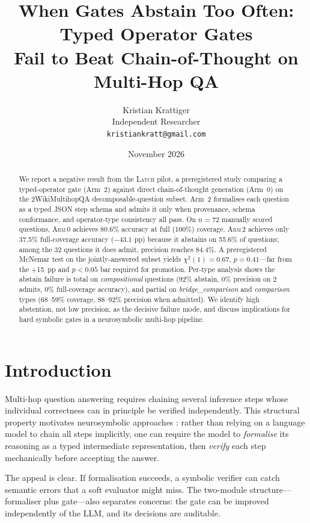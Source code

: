 \documentclass[11pt]{article}
\title{When Gates Abstain Too Often: Typed Operator Gates\\
       Fail to Beat Chain-of-Thought on Multi-Hop QA}
\author{Kristian Krattiger\\
        Independent Researcher\\
        \texttt{kristiankratt@gmail.com}}
\date{November 2026}
\newcommand{\armi}{\textsc{Arm\,0}}
\newcommand{\armii}{\textsc{Arm\,2}}
\newcommand{\latch}{\textsc{Latch}}
\newcommand{\mcnem}{McNemar}
\newcommand{\pval}[1]{$p\!=\!#1$}
\newcommand{\chisq}[1]{$\chi^2(1)\!=\!#1$}
\begin{document}
\maketitle

\begin{abstract}
We report a negative result from the \latch{} pilot, a preregistered study
comparing a typed-operator gate (Arm~2) against direct chain-of-thought
generation (Arm~0) on the 2WikiMultihopQA decomposable-question subset.
Arm~2 formalises each question as a typed JSON step schema and admits
it only when provenance, schema conformance, and operator-type consistency
all pass.  On $n{=}72$ manually scored questions, \armi{} achieves
80.6\% accuracy at full (100\%) coverage.  \armii{} achieves only 37.5\%
full-coverage accuracy ($-43.1$ pp) because it abstains on 55.6\% of
questions; among the 32 questions it does admit, precision reaches 84.4\%.
A preregistered \mcnem{} test on the jointly-answered subset
yields \chisq{0.67}, \pval{0.41}—far from the \mbox{+15 pp} and $p<0.05$
bar required for promotion.  Per-type analysis shows the abstain
failure is total on \emph{compositional} questions (92\% abstain, 0\%
precision on 2 admits, 0\% full-coverage accuracy), and partial on
\emph{bridge\_comparison} and \emph{comparison} types (68–59\% coverage,
88–92\% precision when admitted).  We identify high abstention, not low
precision, as the decisive failure mode, and discuss implications for
hard symbolic gates in a neurosymbolic multi-hop pipeline.
\end{abstract}

\section{Introduction}
\label{sec:intro}

Multi-hop question answering requires chaining several inference steps whose
individual correctness can in principle be verified independently.  This
structural property motivates neurosymbolic approaches
\citep{logicLM,LINC,satlm,faithfulCoT,proofOfThought}: rather than relying on
a language model to chain all steps implicitly, one can require the model to
\emph{formalise} its reasoning as a typed intermediate representation,
then \emph{verify} each step mechanically before accepting the answer.

The appeal is clear.  If formalisation succeeds, a symbolic verifier can
catch semantic errors that a soft evaluator might miss.  The two-module
structure---formaliser plus gate---also separates concerns: the gate can be
improved independently of the LLM, and its decisions are auditable.
\end{document}

